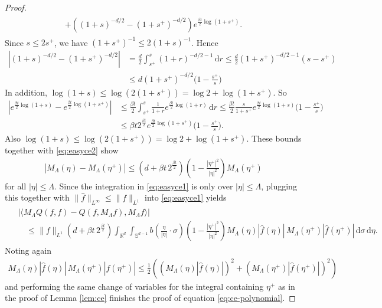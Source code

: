 \documentclass[11pt,a4paper,reqno]{amsart}
\theoremstyle{plain}
\theoremstyle{definition}
\begin{document}
\begin{proof}
\begin{align}
\begin{split}
  		+\left( (1+s)^{-d/2} - (1+s^+)^{-d/2}\right)e^{\frac{\beta t}{2}\log(1+s^+)} .
  \end{split}
  \end{align}
  Since $s\le 2s^+$, we have $ (1+s^+)^{-1}\le 2(1+s)^{-1}$. Hence
  \begin{align*}
  	\left| (1+s)^{-d/2} - (1+s^+)^{-d/2}\right|
  	& = \frac{d}{2}\int_{s^+}^{s} (1+r)^{-d/2-1}\, \mathrm{d}r
  	  \le  \frac{d}{2} (1+s^+)^{-d/2-1} (s-s^+) \\
  	& \le d (1+s^+)^{-d/2} \Big( 1-\frac{s^+}{s} \Big)
  \end{align*}
  In addition, $ \log(1+s)\le \log(2(1+s^+)) = \log2 + \log(1+s^+)$. So
  \begin{align*}
  	\left| e^{\frac{\beta t}{2}\log(1+s)} - e^{\frac{\beta t}{2}\log(1+s^+)} \right|
  	&\le \frac{\beta t}{2} \int_{s^+}^{s} \frac{1}{1+r}e^{\frac{\beta t}{2}\log(1+r)} \, \mathrm{d}r
  	  \le \frac{\beta t}{2} \frac{s}{1+s^+} e^{\frac{\beta t}{2}\log(1+s)}\Big(1-\frac{s^+}{s}\Big) \\
  	&\le \beta t 2^{\frac{\beta t}{2}}e^{\frac{\beta t}{2}\log(1+s^+)}\Big( 1-\frac{s^+}{s} \Big).
  \end{align*}
  Also   $ \log(1+s)\le \log(2(1+s^+)) = \log2 + \log(1+s^+)$. These bounds together with \eqref{eq:easyce2} show
  \begin{align*}
  	\left| M_\Lambda(\eta)  - M_\Lambda(\eta^+) \right|
  	\le \left( d + \beta t\, 2^{\frac{\beta t}{2}} \right)
  	     \left( 1-\frac{|\eta^+|^2}{|\eta|^2} \right)M_\Lambda(\eta^+)
  \end{align*}
  for all $|\eta|\le \Lambda$.
  Since the integration in \eqref{eq:easyce1} is only over $|\eta|\le \Lambda$, plugging this together with $\|\hat{f}\|_{L^\infty}\leq \|f\|_{L^1}$
  into \eqref{eq:easyce1} yields
  \begin{align*}
  \begin{split}
  	&|\langle  M_{\Lambda}Q(f,f) - Q(f,M_{\Lambda}f), M_{\Lambda}f\rangle|
  	  \\
  	&\quad \le
  	 \|f\|_{L^1} \left( d + \beta t \, 2^{\frac{\beta t}{2}} \right) \int_{{\mathbb{R}}^d}
  	 \int_{{\mathbb{S}}^{d-1}} b\left(\frac{\eta}{|\eta|}\cdot\sigma\right)
  	    \left( 1-\frac{|\eta^+|^2}{|\eta|^2} \right)
  	    M_{\Lambda}(\eta) |\hat{f}(\eta)| \, 
  	    M_\Lambda (\eta^+) |\hat{f}(\eta^+)|
  	  \,\mathrm{d}\sigma \,\mathrm{d}\eta.
  \end{split}
  \end{align*}
   Noting again 
   \begin{align*}
   	 	M_{\Lambda}(\eta) |\hat{f}(\eta)| \, M_\Lambda (\eta^+) |\hat{f}(\eta^+)| \leq \frac{1}{2} \left( (M_{\Lambda}(\eta) |\hat{f}(\eta)|)^2 + (M_\Lambda (\eta^+) |\hat{f}(\eta^+)|)^2 \right)
   \end{align*}
   and performing the same change of variables for the integral containing $\eta^+$ as in the proof of Lemma \ref{lem:ce} finishes the proof of equation \eqref{eq:ce-polynomial}.
\end{proof}
\end{document}
